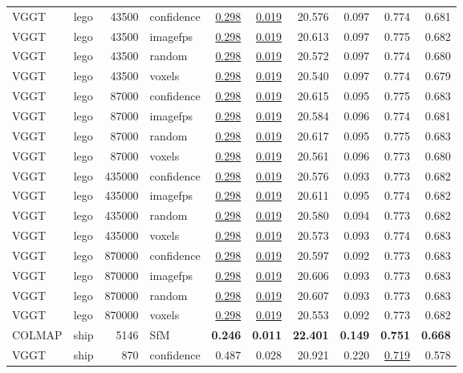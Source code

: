 \begin{table}[H]
\begin{tabular}{llrlrrrrrr}
VGGT & lego & 43500 & confidence & \underline{0.298} & \underline{0.019} & 20.576 & 0.097 & 0.774 & 0.681 \\
VGGT & lego & 43500 & imagefps & \underline{0.298} & \underline{0.019} & 20.613 & 0.097 & 0.775 & 0.682 \\
VGGT & lego & 43500 & random & \underline{0.298} & \underline{0.019} & 20.572 & 0.097 & 0.774 & 0.680 \\
VGGT & lego & 43500 & voxels & \underline{0.298} & \underline{0.019} & 20.540 & 0.097 & 0.774 & 0.679 \\
VGGT & lego & 87000 & confidence & \underline{0.298} & \underline{0.019} & 20.615 & 0.095 & 0.775 & 0.683 \\
VGGT & lego & 87000 & imagefps & \underline{0.298} & \underline{0.019} & 20.584 & 0.096 & 0.774 & 0.681 \\
VGGT & lego & 87000 & random & \underline{0.298} & \underline{0.019} & 20.617 & 0.095 & 0.775 & 0.683 \\
VGGT & lego & 87000 & voxels & \underline{0.298} & \underline{0.019} & 20.561 & 0.096 & 0.773 & 0.680 \\
VGGT & lego & 435000 & confidence & \underline{0.298} & \underline{0.019} & 20.576 & 0.093 & 0.773 & 0.682 \\
VGGT & lego & 435000 & imagefps & \underline{0.298} & \underline{0.019} & 20.611 & 0.095 & 0.774 & 0.682 \\
VGGT & lego & 435000 & random & \underline{0.298} & \underline{0.019} & 20.580 & 0.094 & 0.773 & 0.682 \\
VGGT & lego & 435000 & voxels & \underline{0.298} & \underline{0.019} & 20.573 & 0.093 & 0.774 & 0.683 \\
VGGT & lego & 870000 & confidence & \underline{0.298} & \underline{0.019} & 20.597 & 0.092 & 0.773 & 0.683 \\
VGGT & lego & 870000 & imagefps & \underline{0.298} & \underline{0.019} & 20.606 & 0.093 & 0.773 & 0.683 \\
VGGT & lego & 870000 & random & \underline{0.298} & \underline{0.019} & 20.607 & 0.093 & 0.773 & 0.683 \\
VGGT & lego & 870000 & voxels & \underline{0.298} & \underline{0.019} & 20.553 & 0.092 & 0.773 & 0.682 \\
\midrule
COLMAP & ship & 5146 & SfM & \textbf{0.246} & \textbf{0.011} & \textbf{22.401} & \textbf{0.149} & \textbf{0.751} & \textbf{0.668} \\
VGGT & ship & 870 & confidence & 0.487 & 0.028 & 20.921 & 0.220 & \underline{0.719} & 0.578 \\

\end{tabular}
\end{table}
